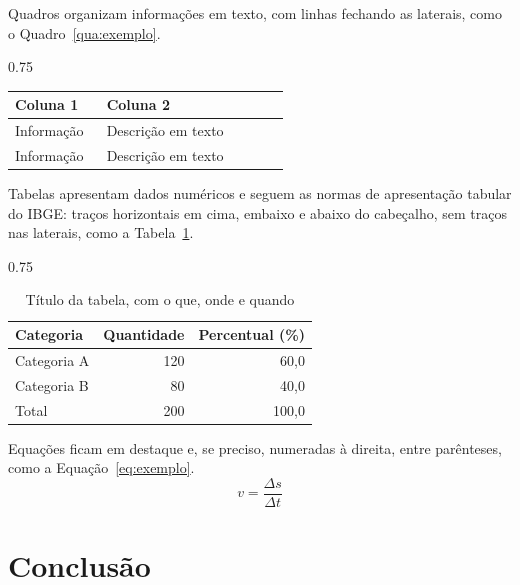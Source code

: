 \documentclass[12pt,a4paper,oneside]{article}
\begin{document}
Quadros organizam informações em texto, com linhas fechando as laterais, como o Quadro~\ref{qua:exemplo}.

\begin{quadro}[htbp]
  \begin{ilustracao}{0.75\textwidth}
    \caption{Título do quadro}\label{qua:exemplo}
    \begin{tabular}{|p{0.3\linewidth}|p{0.6\linewidth}|}
      \hline
      \textbf{Coluna 1} & \textbf{Coluna 2} \\ \hline
      Informação & Descrição em texto \\ \hline
      Informação & Descrição em texto \\ \hline
    \end{tabular}
  \end{ilustracao}
\end{quadro}

Tabelas apresentam dados numéricos e seguem as normas de apresentação tabular do IBGE: traços horizontais em cima, embaixo e abaixo do cabeçalho, sem traços nas laterais, como a Tabela~\ref{tab:exemplo}.

\begin{table}[htbp]
  \begin{ilustracao}{0.75\textwidth}
    \caption{Título da tabela, com o que, onde e quando}\label{tab:exemplo}
    \centering
    \begin{tabular*}{\linewidth}{@{\extracolsep{\fill}}lrr}
      \toprule
      Categoria & Quantidade & Percentual (\%) \\
      \midrule
      Categoria A & 120 & 60,0 \\
      Categoria B & 80 & 40,0 \\
      \midrule
      Total & 200 & 100,0 \\
      \bottomrule
    \end{tabular*}
  \end{ilustracao}
\end{table}

Equações ficam em destaque e, se preciso, numeradas à direita, entre parênteses, como a Equação~\eqref{eq:exemplo}.
\begin{equation}
  v = \frac{\Delta s}{\Delta t}
  \label{eq:exemplo}
\end{equation}

\section{Conclusão}
\end{document}
